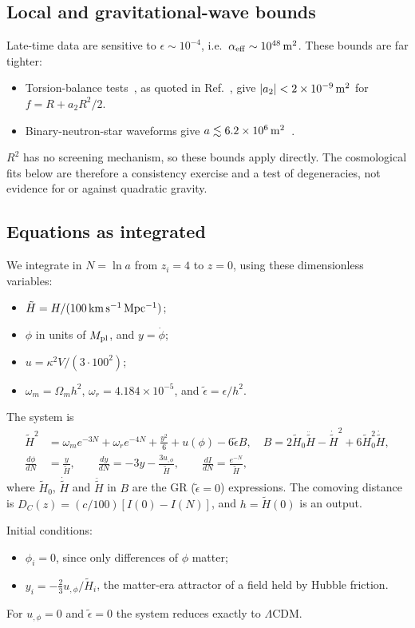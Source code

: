\documentclass[11pt,a4paper]{article}
\newcommand{\Mpl}{M_{\rm pl}}
\newcommand{\aeff}{\alpha_{\rm eff}}
\newcommand{\et}{\tilde\epsilon}
\begin{document}
\subsection{Local and gravitational-wave bounds}\label{sec:bounds}
Late-time data are sensitive to $\epsilon\sim10^{-4}$, i.e.\ $\aeff\sim10^{48}\,{\rm m^2}$. These bounds are far tighter:
\begin{itemize}
\item Torsion-balance tests~\cite{hep-ph_0611184}, as quoted in Ref.~\cite{1104.0819}, give $|a_2|<2\times10^{-9}\,{\rm m^2}$ for $f=R+a_2R^2/2$.
\item Binary-neutron-star waveforms give $a\lesssim6.2\times10^{6}\,{\rm m^2}$~\cite{2611.06902}.
\end{itemize}
$R^2$ has no screening mechanism, so these bounds apply directly. The cosmological fits below are therefore a consistency exercise and a test of degeneracies, not evidence for or against quadratic gravity.

\subsection{Equations as integrated}
We integrate in $N=\ln a$ from $z_i=4$ to $z=0$, using these dimensionless variables:
\begin{itemize}
\item $\tilde H=H/(100\,{\rm km\,s^{-1}\,Mpc^{-1}})$;
\item $\phi$ in units of $\Mpl$, and $y=\dot\phi$;
\item $u=\kappa^2V/(3\cdot100^2)$;
\item $\omega_m=\Omega_mh^2$, $\omega_r=4.184\times10^{-5}$, and $\et=\epsilon/h^2$.
\end{itemize}
The system is
\begin{align}
\tilde H^2&=\omega_me^{-3N}+\omega_re^{-4N}+\tfrac{y^2}{6}+u(\phi)-6\et B,\quad B=2\tilde H_0\ddot{\tilde H}-\dot{\tilde H}^2+6\tilde H_0^2\dot{\tilde H},\\
\frac{d\phi}{dN}&=\frac{y}{\tilde H},\qquad \frac{dy}{dN}=-3y-\frac{3u_{,\phi}}{\tilde H},\qquad \frac{dI}{dN}=\frac{e^{-N}}{\tilde H},
\end{align}
where $\tilde H_0$, $\dot{\tilde H}$ and $\ddot{\tilde H}$ in $B$ are the GR ($\et=0$) expressions. The comoving distance is $D_C(z)=(c/100)[I(0)-I(N)]$, and $h=\tilde H(0)$ is an output.

Initial conditions:
\begin{itemize}
\item $\phi_i=0$, since only differences of $\phi$ matter;
\item $y_i=-\tfrac23u_{,\phi}/\tilde H_i$, the matter-era attractor of a field held by Hubble friction.
\end{itemize}
For $u_{,\phi}=0$ and $\et=0$ the system reduces exactly to $\Lambda$CDM.
\end{document}
